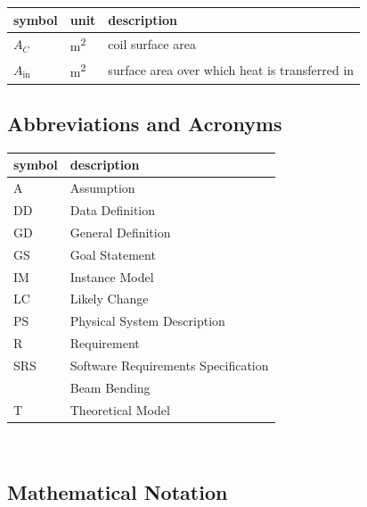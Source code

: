 \documentclass[12pt]{article}
\begin{document}
\renewcommand{\arraystretch}{1.2}
\noindent \begin{longtable*}{l l p{12cm}} \toprule
    \textbf{symbol} & \textbf{unit} & \textbf{description}\\
    \midrule
    $A_C$ & \si[per-mode=symbol] {\square\metre} & coil surface area
    \\
    $A_\text{in}$ & \si[per-mode=symbol] {\square\metre} & surface area over
    which heat is transferred in
    \\
    \bottomrule
\end{longtable*}

\subsection{Abbreviations and Acronyms}

\renewcommand{\arraystretch}{1.2}
\begin{tabular}{l l}
    \toprule
    \textbf{symbol} & \textbf{description}                \\
    \midrule
    A               & Assumption                          \\
    DD              & Data Definition                     \\
    GD              & General Definition                  \\
    GS              & Goal Statement                      \\
    IM              & Instance Model                      \\
    LC              & Likely Change                       \\
    PS              & Physical System Description         \\
    R               & Requirement                         \\
    SRS             & Software Requirements Specification \\
    \progname{}     & Beam Bending                        \\
    T               & Theoretical Model                   \\
    \bottomrule
\end{tabular}\\

\subsection{Mathematical Notation}
\end{document}
